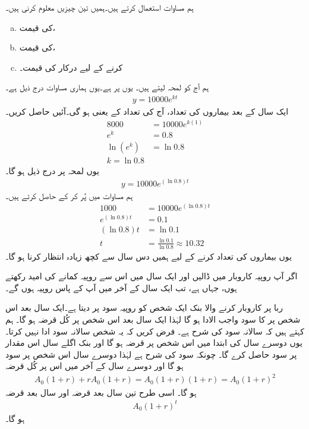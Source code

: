 ہم مساوات  استعمال کرتے ہیں۔ہمیں تین چیزیں معلوم کرنی ہیں۔
\begin{enumerate}[a.]
\item
{} کی قیمت،
\item
{} کی قیمت،
\item
{} کرنے کے لیے درکار  کی قیمت۔
\end{enumerate}
\quad {}\quad
ہم آج کو لمحہ  لیتے ہیں۔ یوں  پر  ہے۔یوں ہماری مساوات درج ذیل ہے۔
\begin{align*}
y=\num{10000}e^{kt}
\end{align*}
\quad {}\quad
ایک سال کے بعد بیماروں کی تعداد، آج کی تعداد کے   یعنی  ہو گی۔آئیں  حاصل کریں۔
\begin{align*}
8000&=\num{10000}e^{k(1)}\\
e^k&=0.8\\
\ln(e^k)&=\ln 0.8\\
k=\ln 0.8
\end{align*} 
یوں لمحہ  پر درج ذیل ہو گا۔
\begin{align}\label{مساوات_ماورائی_مثال_بیماری}
y=\num{10000}e^{(\ln 0.8)t}
\end{align}
\quad {}\quad
ہم مساوات  میں  پُر کر کے  حاصل کرتے ہیں۔
\begin{align*}
1000&=\num{10000}e^{(\ln 0.8)t}\\
e^{(\ln 0.8)t}&=0.1\\
(\ln 0.8)t&=\ln 0.1\\
t&=\frac{\ln 0.1}{\ln 0.8}\approx 10.32
\end{align*}
یوں بیماروں کی تعداد  کرنے کے لیے ہمیں دس سال سے کچھ زیادہ انتظار کرنا ہو گا۔

اگر آپ  روپیہ کاروبار میں ڈالیں اور ایک سال میں اس سے  روپیہ کمانے کی امید رکھتے ہوں، جہاں  ہے، تب ایک سال کے آخر میں آپ کے پاس  روپیہ ہوں گے۔ 

ربا پر کاروبار کرنے والا بنک ایک شخص کو  روپیہ سود پر دیتا ہے۔ایک سال بعد اس شخص پر  کا سود واجب الادا ہو گا لہٰذا ایک سال بعد  اس شخص پر کُل قرضہ     ہو گا۔ ہم کہتے ہیں کہ سالانہ سود کی شرح  ہے۔ فرض کریں کہ یہ شخص سالانہ سود ادا نہیں کرتا۔ یوں دوسرے سال کی ابتدا میں اس شخص پر  قرضہ ہو گا اور بنک اگلے سال اس مقدار پر سود حاصل کرے گا۔ چونکہ سود کی شرح  ہے لہٰذا دوسرے سال اس شخص پر سود  ہو گا اور دوسرے سال کے آخر میں اس پر کُل قرضہ
\begin{align*}
A_0(1+r)+rA_0(1+r)=A_0(1+r)(1+r)=A_0(1+r)^2
\end{align*}
 ہو گا۔ اسی طرح تین سال بعد قرضہ  اور   سال بعد قرضہ
\begin{align*}
A_0(1+r)^t
\end{align*}
ہو گا۔

